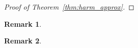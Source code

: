 \documentclass[10pt]{article}
\newcommand{\1}{\mathbbm 1}
\renewcommand{\o}{\mathrm{o}}
\newtheorem{remark}{Remark}
\begin{document}
\begin{proof}[Proof of Theorem~\ref{thm:harm_approx}]



    \end{proof}

    \begin{remark}
        
    \end{remark}

    \begin{remark}
    \end{remark}
\end{document}
